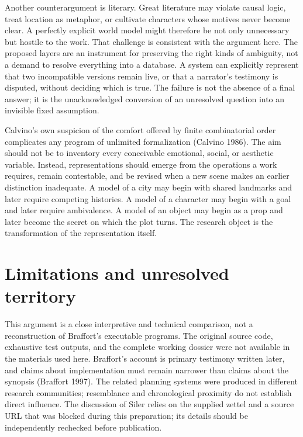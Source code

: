 \documentclass[
  11pt,
  letterpaper,
]{article}
\begin{document}
Another counterargument is literary. Great literature may violate causal
logic, treat location as metaphor, or cultivate characters whose motives
never become clear. A perfectly explicit world model might therefore be
not only unnecessary but hostile to the work. That challenge is
consistent with the argument here. The proposed layers are an instrument
for preserving the right kinds of ambiguity, not a demand to resolve
everything into a database. A system can explicitly represent that two
incompatible versions remain live, or that a narrator's testimony is
disputed, without deciding which is true. The failure is not the absence
of a final answer; it is the unacknowledged conversion of an unresolved
question into an invisible fixed assumption.

Calvino's own suspicion of the comfort offered by finite combinatorial
order complicates any program of unlimited formalization (Calvino 1986).
The aim should not be to inventory every conceivable emotional, social,
or aesthetic variable. Instead, representations should emerge from the
operations a work requires, remain contestable, and be revised when a
new scene makes an earlier distinction inadequate. A model of a city may
begin with shared landmarks and later require competing histories. A
model of a character may begin with a goal and later require
ambivalence. A model of an object may begin as a prop and later become
the secret on which the plot turns. The research object is the
transformation of the representation itself.

\section{Limitations and unresolved
territory}\label{limitations-and-unresolved-territory}

This argument is a close interpretive and technical comparison, not a
reconstruction of Braffort's executable programs. The original source
code, exhaustive test outputs, and the complete working dossier were not
available in the materials used here. Braffort's account is primary
testimony written later, and claims about implementation must remain
narrower than claims about the synopsis (Braffort 1997). The related
planning systems were produced in different research communities;
resemblance and chronological proximity do not establish direct
influence. The discussion of Siler relies on the supplied zettel and a
source URL that was blocked during this preparation; its details should
be independently rechecked before publication.
\end{document}
